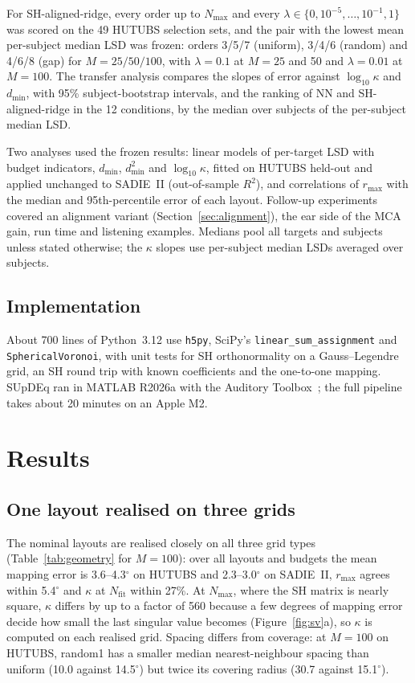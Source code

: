\documentclass[11pt,a4paper]{article}
\newcommand{\dmin}{d_{\min}}
\newcommand{\rmax}{r_{\max}}
\begin{document}
For SH-aligned-ridge, every order up to $N_{\max}$ and every $\lambda\in\{0,10^{-5},\dots,10^{-1},1\}$ was scored on the 49 HUTUBS selection sets, and the pair with the lowest mean per-subject median LSD was frozen: orders 3/5/7 (uniform), 3/4/6 (random) and 4/6/8 (gap) for $M=25/50/100$, with $\lambda=0.1$ at $M=25$ and 50 and $\lambda=0.01$ at $M=100$. The transfer analysis compares the slopes of error against $\log_{10}\kappa$ and $\dmin$, with 95\% subject-bootstrap intervals, and the ranking of NN and SH-aligned-ridge in the 12 conditions, by the median over subjects of the per-subject median LSD.

Two analyses used the frozen results: linear models of per-target LSD with budget indicators, $\dmin$, $\dmin^2$ and $\log_{10}\kappa$, fitted on HUTUBS held-out and applied unchanged to SADIE~II (out-of-sample $R^2$), and correlations of $\rmax$ with the median and 95th-percentile error of each layout. Follow-up experiments covered an alignment variant (Section~\ref{sec:alignment}), the ear side of the MCA gain, run time and listening examples. Medians pool all targets and subjects unless stated otherwise; the $\kappa$ slopes use per-subject median LSDs averaged over subjects.

\subsection{Implementation}

About 700 lines of Python~3.12 use \texttt{h5py}, SciPy's \texttt{linear\_sum\_assignment} and \texttt{SphericalVoronoi}, with unit tests for SH orthonormality on a Gauss--Legendre grid, an SH round trip with known coefficients and the one-to-one mapping. SUpDEq ran in MATLAB R2026a with the Auditory Toolbox~\cite{slaney1998}; the full pipeline takes about 20 minutes on an Apple M2.

\section{Results}
\label{sec:results}

\subsection{One layout realised on three grids}

The nominal layouts are realised closely on all three grid types (Table~\ref{tab:geometry} for $M=100$): over all layouts and budgets the mean mapping error is 3.6--4.3$^\circ$ on HUTUBS and 2.3--3.0$^\circ$ on SADIE~II, $\rmax$ agrees within 5.4$^\circ$ and $\kappa$ at $N_{\mathrm{fit}}$ within 27\%. At $N_{\max}$, where the SH matrix is nearly square, $\kappa$ differs by up to a factor of 560 because a few degrees of mapping error decide how small the last singular value becomes (Figure~\ref{fig:sv}a), so $\kappa$ is computed on each realised grid. Spacing differs from coverage: at $M=100$ on HUTUBS, random1 has a smaller median nearest-neighbour spacing than uniform (10.0 against 14.5$^\circ$) but twice its covering radius (30.7 against 15.1$^\circ$).
\end{document}
